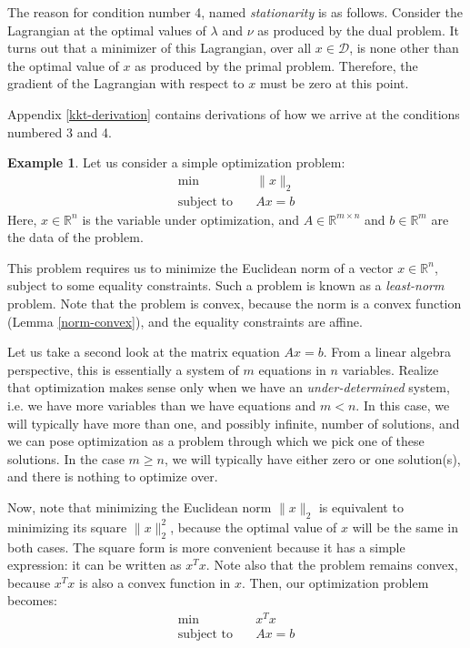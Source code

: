 \documentclass[a4paper]{article}
\theoremstyle{definition}
\newtheorem{example}{Example}[section]
\begin{document}
The reason for condition number 4, named \textit{stationarity} is as follows.
Consider the Lagrangian at the optimal values of $\lambda$ and $\nu$ as produced by the dual problem.
It turns out that a minimizer of this Lagrangian, over all $x \in \mathcal{D}$, is none other than the optimal value of $x$ as produced by the primal problem.
Therefore, the gradient of the Lagrangian with respect to $x$ must be zero at this point.

Appendix \ref{kkt-derivation} contains derivations of how we arrive at the conditions numbered 3 and 4.

\begin{example}
	Let us consider a simple optimization problem:
	\begin{align*}
		\min \quad & \| x \|_2 \\
		\text{subject to} \quad & Ax = b
	\end{align*}
	Here, $x \in \mathbb{R}^n$ is the variable under optimization, and $A \in \mathbb{R}^{m \times n}$ and $b \in \mathbb{R}^m$ are the data of the problem.

	This problem requires us to minimize the Euclidean norm of a vector $x \in \mathbb{R}^n$, subject to some equality constraints.
	Such a problem is known as a \textit{least-norm} problem.
	Note that the problem is convex, because the norm is a convex function (Lemma \ref{norm-convex}), and the equality constraints are affine.

	Let us take a second look at the matrix equation $Ax = b$.
	From a linear algebra perspective, this is essentially a system of $m$ equations in $n$ variables.
	Realize that optimization makes sense only when we have an \textit{under-determined} system, i.e. we have more variables than we have equations and $m < n$.
	In this case, we will typically have more than one, and possibly infinite, number of solutions, and we can pose optimization as a problem through which we pick one of these solutions.
	In the case $m \geq n$, we will typically have either zero or one solution(s), and there is nothing to optimize over.

	Now, note that minimizing the Euclidean norm $\| x \|_2$ is equivalent to minimizing its square $\| x \|_2^2$, because the optimal value of $x$ will be the same in both cases.
	The square form is more convenient because it has a simple expression: it can be written as $x^T x$.
	Note also that the problem remains convex, because $x^T x$ is also a convex function in $x$.
	Then, our optimization problem becomes:
	\begin{align*}
		\min \quad & x^T x \\
		\text{subject to} \quad & Ax = b
	\end{align*}


\end{example}
\end{document}
